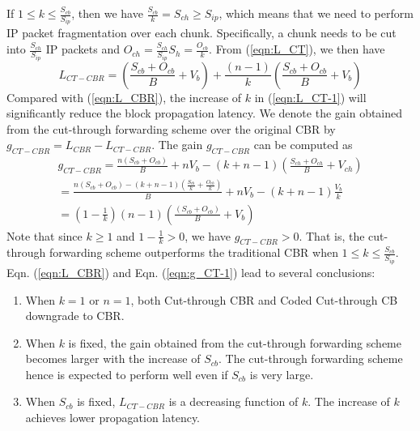 \documentclass[10pt,journal,compsoc]{IEEEtran}
\begin{document}
If $1 \le k \le \frac{{{S_{cb}}}}{{{S_{ip}}}}$, then we have $\frac{{{S_{cb}}}}{k} = {S_{ch}} \ge {S_{ip}}$, which means that we need to perform IP packet fragmentation over each chunk. Specifically, a chunk needs to be cut into $\frac{{{S_{ch}}}}{{{S_{ip}}}}$ IP packets and ${O_{ch}} = \frac{{{S_{ch}}}}{{{S_{ip}}}}{S_h} = \frac{{{O_{cb}}}}{k}$. From (\ref{eqn:L_CT}), we then have 
\begin{equation}
	\label{eqn:L_CT-1}
	{L_{CT - CBR}} = (\frac{{{S_{cb}} + {O_{cb}}}}{B} + {V_b}) + \frac{{(n - 1)}}{k}(\frac{{{S_{cb}} + {O_{cb}}}}{B} + {V_b})
\end{equation}
Compared with (\ref{eqn:L_CBR}), the increase of $k$ in (\ref{eqn:L_CT-1}) will significantly reduce the block propagation latency. We denote the gain obtained from the cut-through forwarding scheme over the original CBR by ${g_{CT - CBR}} = {L_{CBR}} - {L_{CT - CBR}}$. The gain ${g_{CT - CBR}}$ can be computed as
\begin{equation}
	\label{eqn:g_CT-1}
	\begin{array}{l}
	{g_{CT - CBR}} = \frac{{n({S_{cb}} + {O_{cb}})}}{B} + n{V_b} - (k + n - 1)(\frac{{{S_{ch}} + {O_{ch}}}}{B} + {V_{ch}})\\
	= \frac{{n({S_{cb}} + {O_{cb}}) - (k + n - 1)(\frac{{{S_{cb}}}}{k} + \frac{{{O_{cb}}}}{k})}}{B} + n{V_b} - (k + n - 1)\frac{{{V_b}}}{k}\\
	= (1 - \frac{1}{k})(n - 1)(\frac{{({S_{cb}} + {O_{cb}})}}{B} + {V_b})
	\end{array}
\end{equation}
Note that since $k \ge 1$ and $1 - \frac{1}{k} > 0$, we have ${g_{CT - CBR}} > 0$. That is, the cut-through forwarding scheme outperforms the traditional CBR when $1 \le k \le \frac{{{S_{cb}}}}{{{S_{ip}}}}$. Eqn. (\ref{eqn:L_CBR}) and Eqn. (\ref{eqn:g_CT-1}) lead to several conclusions:
\begin{enumerate}
	\item When $k = 1$ or $n = 1$, both Cut-through CBR and Coded Cut-through CB downgrade to CBR. 
	\item When $k$ is fixed, the gain obtained from the cut-through forwarding scheme becomes larger with the increase of ${S_{cb}}$. The cut-through forwarding scheme hence is expected to perform well even if ${S_{cb}}$ is very large.
	\item When ${S_{cb}}$ is fixed, ${L_{CT - CBR}}$ is a decreasing function of $k$. The increase of $k$ achieves lower propagation latency. 
\end{enumerate}
\end{document}
